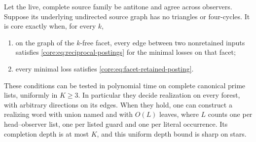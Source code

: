 \begin{theorem}
\label{core:thm:girth-five-source-guards}
Let the live, complete source family be antitone and agree across
observers. Suppose its underlying undirected source graph has no
triangles or four-cycles. It is core exactly when, for every $k$,
\begin{enumerate}
\item on the graph of the $k$-free facet, every edge between two
nonretained inputs satisfies \eqref{core:eq:reciprocal-postings}
for the minimal losses on that facet;
\item every minimal loss satisfies \eqref{core:eq:facet-retained-posting}.
\end{enumerate}
These conditions can be tested in polynomial time on complete canonical
prime lists, uniformly in $K\ge3$. In particular they decide realization
on every forest, with arbitrary directions on its edges.
When they hold, one can construct a realizing word with union named
and with $O(L)$ leaves, where $L$ counts one per head--observer list,
one per listed guard and one per literal occurrence. Its completion
depth is at most $K$, and this uniform depth bound is sharp on stars.
\end{theorem}
